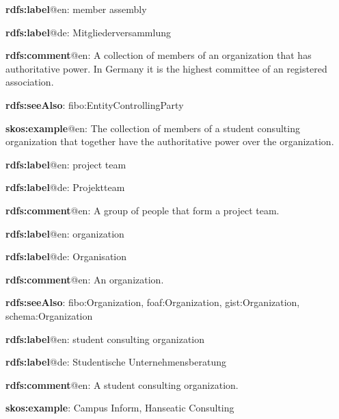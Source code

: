 \documentclass[a4paper, DIV=13, BCOR=0cm]{scrbook}
\begin{document}
\begin{mdframed}[style=onto-2, frametitle={Member\_Assembly}]
	{%
		\begin{compactitem}
			\item \textbf{rdfs:label}@en: member assembly
			\item \textbf{rdfs:label}@de: Mitgliederversammlung
			\item \textbf{rdfs:comment}@en: A collection of members of an organization that has authoritative power. In Germany it is the highest committee of an registered association.
			\item \textbf{rdfs:seeAlso}: fibo:EntityControllingParty
			\item \textbf{skos:example}@en: The collection of members of a student consulting organization that together have the authoritative power over the organization.
		\end{compactitem}
	} %
\end{mdframed}

\begin{mdframed}[style=onto-2, frametitle={Project\_Team}]
	{%
		\begin{compactitem}
			\item \textbf{rdfs:label}@en: project team
			\item \textbf{rdfs:label}@de: Projektteam
			\item \textbf{rdfs:comment}@en: A group of people that form a project team.
		\end{compactitem}
	} %
\end{mdframed}

\begin{mdframed}[style=onto-1, frametitle={Organization}]
	{%
		\begin{compactitem}
			\item \textbf{rdfs:label}@en: organization
			\item \textbf{rdfs:label}@de: Organisation
			\item \textbf{rdfs:comment}@en: An organization.
			\item \textbf{rdfs:seeAlso}: fibo:Organization, foaf:Organization, gist:Organization, \\ schema:Organization
		\end{compactitem}
	} %
\end{mdframed}

\begin{mdframed}[style=onto-2, frametitle={Student\_Consulting\_Organization}]
	{%
		\begin{compactitem}
			\item \textbf{rdfs:label}@en: student consulting organization
			\item \textbf{rdfs:label}@de: Studentische Unternehmensberatung
			\item \textbf{rdfs:comment}@en: A student consulting organization.
			\item \textbf{skos:example}: Campus Inform, Hanseatic Consulting
		\end{compactitem}
	} %
\end{mdframed}
\end{document}
